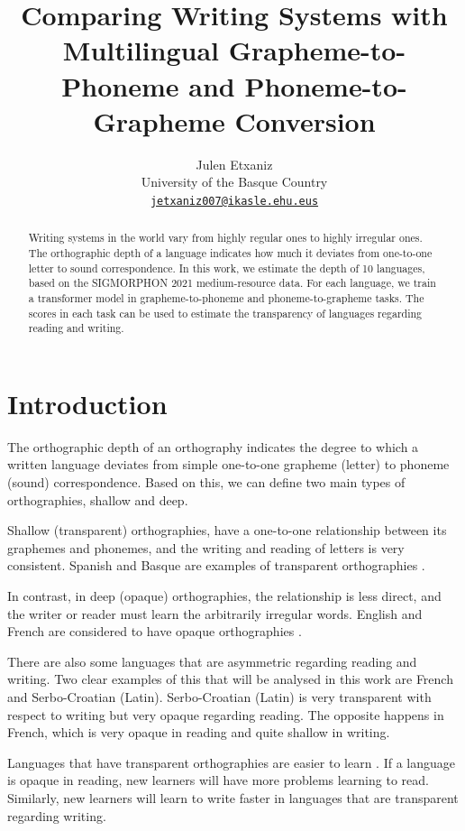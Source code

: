 \documentclass[11pt,a4paper]{article}
\title{Comparing Writing Systems with Multilingual Grapheme-to-Phoneme and Phoneme-to-Grapheme Conversion}
\author{Julen Etxaniz \\
  University of the Basque Country\\
  \texttt{\href{mailto:jetxaniz007@ikasle.ehu.eus}{jetxaniz007@ikasle.ehu.eus}}}
\date{}
\begin{document}
\maketitle

\begin{abstract}
Writing systems in the world vary from highly regular ones to highly irregular ones. The orthographic depth of a language indicates how much it deviates from one-to-one letter to sound correspondence. In this work, we estimate the depth of 10 languages, based on the SIGMORPHON 2021 medium-resource data. For each language, we train a transformer model in grapheme-to-phoneme and phoneme-to-grapheme tasks. The scores in each task can be used to estimate the transparency of languages regarding reading and writing.
\end{abstract}

\section{Introduction}

The orthographic depth of an orthography indicates the degree to which a written language deviates from simple one-to-one grapheme (letter) to phoneme (sound) correspondence. Based on this, we can define two main types of orthographies, shallow and deep.

Shallow (transparent) orthographies, have a one-to-one relationship between its graphemes and phonemes, and the writing and reading of letters is very consistent. Spanish and Basque are examples of transparent orthographies \cite{goswami2006orthography}.

In contrast, in deep (opaque) orthographies, the relationship is less direct, and the writer or reader must learn the arbitrarily irregular words. English and French are considered to have opaque orthographies \cite{goswami2006orthography}.

There are also some languages that are asymmetric regarding reading and writing. Two clear examples of this that will be analysed in this work are French and Serbo-Croatian (Latin). Serbo-Croatian (Latin) is very transparent with respect to writing but very opaque regarding reading. The opposite happens in French, which is very opaque in reading and quite shallow in writing.

Languages that have transparent orthographies are easier to learn \cite{goswami2006orthography}. If a language is opaque in reading, new learners will have more problems learning to read. Similarly, new learners will learn to write faster in languages that are transparent regarding writing.
\end{document}
